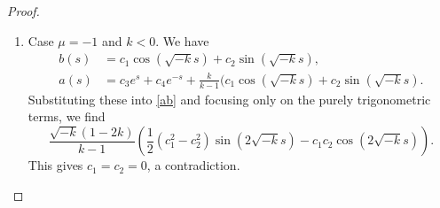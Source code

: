 \documentclass[10pt,a4paper]{amsart}
\begin{document}
\begin{proof}
\begin{enumerate}
\begin{enumerate}
\begin{enumerate}
\item Case $\mu=-1$ and $k<0$. We have 
\begin{equation*}
\begin{split}
b(s)&=c_1\cos (\sqrt{-k}s)+c_2 \sin(\sqrt{-k}s),\\
a(s) &= c_3 e^{s} + c_4 e^{-s}+ \frac{k}{k-1} ( c_1 \cos( \sqrt{-k} s )+c_2 \sin( \sqrt{-k}s ) .
\end{split}
\end{equation*}
Substituting these into \eqref{ab} and focusing only on the purely trigonometric terms, we find  
$$
\frac{\sqrt{-k}(1-2k)}{k-1} ( \frac12(c_{1}^2 - c_{2}^2) \sin(2 \sqrt{-k}s) - c_{1} c_{2} \cos(2 \sqrt{-k} s)).
$$
This gives $c_1=c_2=0$,  a contradiction.

\end{enumerate}
\end{enumerate}
\end{enumerate}
\end{proof}
\end{document}
